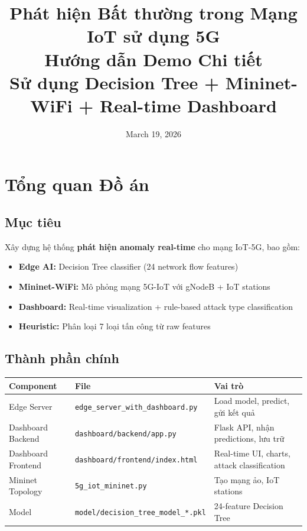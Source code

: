 \documentclass[12pt,a4paper]{article}
\title{
    \textbf{Phát hiện Bất thường trong Mạng IoT sử dụng 5G} \\
    \large Hướng dẫn Demo Chi tiết \\
    \small Sử dụng Decision Tree + Mininet-WiFi + Real-time Dashboard
}
\author{}
\date{March 19, 2026}
\begin{document}
\maketitle

\tableofcontents
\newpage

\section{Tổng quan Đồ án}

\subsection{Mục tiêu}
Xây dựng hệ thống \textbf{phát hiện anomaly real-time} cho mạng IoT-5G, bao gồm:
\begin{itemize}
    \item \textbf{Edge AI:} Decision Tree classifier (24 network flow features)
    \item \textbf{Mininet-WiFi:} Mô phỏng mạng 5G-IoT với gNodeB + IoT stations
    \item \textbf{Dashboard:} Real-time visualization + rule-based attack type classification
    \item \textbf{Heuristic:} Phân loại 7 loại tấn công từ raw features
\end{itemize}

\subsection{Thành phần chính}
\begin{table}[h]
\centering
\begin{tabularx}{\textwidth}{|l|X|X|}
\hline
\textbf{Component} & \textbf{File} & \textbf{Vai trò} \\
\hline
Edge Server & \texttt{edge\_server\_with\_dashboard.py} & Load model, predict, gửi kết quả \\
\hline
Dashboard Backend & \texttt{dashboard/backend/app.py} & Flask API, nhận predictions, lưu trữ \\
\hline
Dashboard Frontend & \texttt{dashboard/frontend/index.html} & Real-time UI, charts, attack classification \\
\hline
Mininet Topology & \texttt{5g\_iot\_mininet.py} & Tạo mạng ảo, IoT stations \\
\hline
Model & \texttt{model/decision\_tree\_model\_*.pkl} & 24-feature Decision Tree \\
\hline
\end{tabularx}
\end{table}
\end{document}
